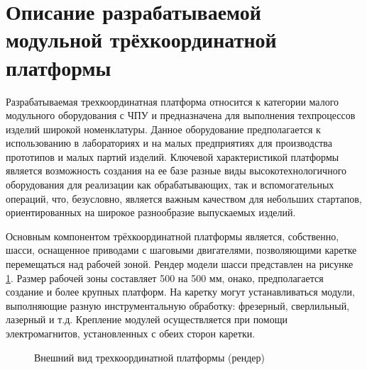 \section{Описание разрабатываемой модульной трёхкоординатной платформы} \label{sect1_5}

Разрабатываемая трехкоординатная платформа относится к категории малого модульного оборудования с ЧПУ и предназначена для выполнения техпроцессов изделий широкой номенклатуры. Данное оборудование предполагается к использованию в лабораториях и на малых предприятиях для производства прототипов и малых партий изделий. Ключевой характеристикой платформы является возможность создания на ее базе разные виды высокотехнологичного оборудования для реализации как обрабатывающих, так и вспомогательных операций, что, безусловно, является важным качеством для небольших стартапов, ориентированных на широкое разнообразие выпускаемых изделий.

Основным компонентом трёхкоординатной платформы является, собственно, шасси, оснащенное приводами с шаговыми двигателями, позволяющими каретке перемещаться над рабочей зоной. Рендер модели шасси представлен на рисунке \cref{fig:table-r}. Размер рабочей зоны составляет 500 на 500 мм, онако, предполагается создание и более крупных платформ. На каретку могут устанавливаться модули, выполняющие разную инструментальную обработку: фрезерный, сверлильный, лазерный и т.д. Крепление модулей осуществляется при помощи электромагнитов, установленных с обеих сторон каретки.

\begin{figure}[ht]
	\caption{Внешний вид трехкоординатной платформы (рендер)}\label{fig:table-r}
\end{figure}


